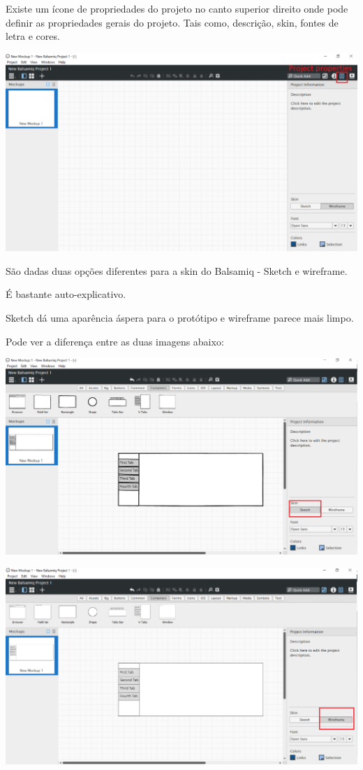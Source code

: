 \documentclass{tufte-book} %
\begin{document}
Existe um ícone de propriedades do projeto no canto superior direito onde pode definir as propriedades gerais do projeto. Tais como, descrição, skin, fontes de letra e cores.

\begin{center}
	\includegraphics{img5.png}
\end{center}

São dadas duas opções diferentes para a skin do Balsamiq - Sketch e wireframe.

É bastante auto-explicativo.

Sketch dá uma aparência áspera para o protótipo e wireframe parece mais limpo.

\break

Pode ver a diferença entre as duas imagens abaixo:

\begin{center}
	\includegraphics{img6.png}
\end{center}

\begin{center}
	\includegraphics{img7.png}
\end{center}
\end{document}
